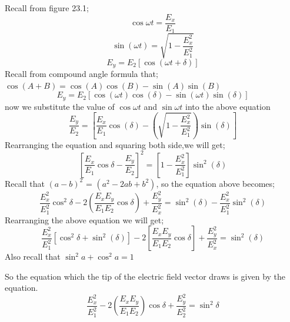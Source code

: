 Recall from figure 23.1; 
\begin{equation}
\cos{\omega t} = \frac{E_x}{E_1}
\end{equation}
\begin{equation}
\sin (\omega t) = \sqrt{1-\frac{E_{x}^2}{E_{1}^2}}
\end{equation}
\begin{equation}
E_y = E_2 [\cos(\omega t + \delta)]
\end{equation}
Recall from compound angle formula that; $\cos(A+B) = \cos(A)\cos(B) - \sin(A)\sin(B)$ 
\begin{equation}
E_y = E_2 [\cos(\omega t)\cos(\delta) -\sin(\omega t) \sin(\delta)]
\end{equation}
now we substitute the value of $\cos{\omega t}$ and $\sin{\omega t}$ into the above equation
\begin{equation}
\frac{E_y}{E_2} =[\frac{E_x}{E_1}\cos(\delta)-(\sqrt{1 - \frac{E_{x}^2}{E_{1}^2}})\sin(\delta)]
\end{equation}
Rearranging the equation and squaring both side,we will get;
\begin{equation}
{[\frac{E_x}{E_1}\cos{\delta}-\frac{E_y}{E_2}]}^2 = [1-\frac{E_{x}^2}{E_{1}^2}]\sin^2(\delta)
\end{equation}
Recall that ${(a-b)}^2$ = $(a^2-2ab+b^2)$, so the equation above becomes;
\begin{dmath}
\frac{E_{x}^2}{E_{1}^2}\cos^2{\delta}-2(\frac{E_{x}E_{y}}{E_{1}E_{2}}\cos{\delta}) + \frac{E_{y}^2}{E_{x}^2} = \sin^2(\delta)-\frac{E_{x}^2}{E_{1}^2}\sin^2(\delta)
\end{dmath}
Rearranging the above equation we will get;
\begin{equation}
\frac{E_{x}^2}{E_{1}^2}[\cos^2{\delta} + \sin ^2(\delta)] - 2[\frac{E_{x}E_{y}}{E_{1}E_{2}}\cos{\delta}] + \frac{E_{y}^2}{E_{x}^2} = \sin^2(\delta)
\end{equation}
Also recall that $ \sin^2{a} + \cos^2{a} =  1$

So the equation which the tip of the electric field vector draws is given by the equation.
\begin{equation}
\frac{E_{x}^2}{E_{1}^2} -2(\frac{E_{x}E_{y}}{E_{1}E_{2}})\cos\delta + \frac{E_{y}^2}{E_{2}^2} =\sin^2 \delta
\end{equation}

